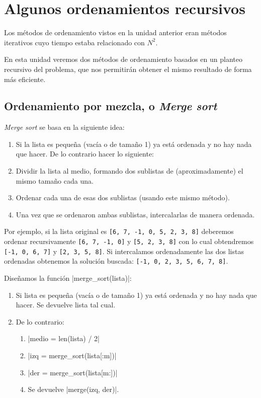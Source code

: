 \chapter{Algunos ordenamientos recursivos}

Los métodos de ordenamiento vistos en la unidad anterior eran métodos
iterativos cuyo tiempo estaba relacionado con $N^2$.

En esta unidad veremos dos métodos de ordenamiento basados
en un planteo recursivo del problema, que nos permitirán obtener el
mismo resultado de forma más eficiente.

\section{Ordenamiento por mezcla, o {\it Merge sort} }

{\it Merge sort} se basa en la siguiente idea:

\begin{enumerate}
\item Si la lista es pequeña (vacía o de tamaño 1) ya está ordenada y
no hay nada que hacer. De lo contrario hacer lo siguiente:
\item Dividir la lista al medio, formando dos sublistas de (aproximadamente) el
mismo tamaño cada una.
\item Ordenar cada una de esas dos sublistas (usando
este mismo método).
\item Una vez que se ordenaron ambas sublistas, intercalarlas de manera ordenada.
\end{enumerate}

Por ejemplo, si la lista original es \lstinline+[6, 7, -1, 0, 5, 2, 3, 8]+
deberemos ordenar recursivamente \lstinline+[6, 7, -1, 0]+ y
\lstinline+[5, 2, 3, 8]+ con lo cual obtendremos \lstinline+[-1, 0, 6, 7]+ y
\lstinline+[2, 3, 5, 8]+.  Si intercalamos ordenadamente las dos listas
ordenadas obtenemos la solución buscada:
\lstinline+[-1, 0, 2, 3, 5, 6, 7, 8]+.

Diseñamos la función |merge_sort(lista)|:

\begin{enumerate}
\item Si lista es pequeña (vacía o de tamaño 1) ya está ordenada y
no hay nada que hacer. Se devuelve lista tal cual.
\item De lo contrario:
\begin{enumerate}
\item |medio = len(lista) / 2|
\item |izq = merge_sort(lista[:m])|
\item |der = merge_sort(lista[m:])|
\item Se devuelve |merge(izq, der)|.
\end{enumerate}
\end{enumerate}

